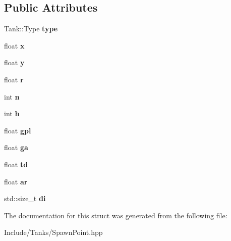 \subsection*{Public Attributes}
\begin{DoxyCompactItemize}
\item 
\hypertarget{struct_enemy_spawn_point_af4a2702c7808b9dd4002a8cd67119603}{}Tank\+::\+Type {\bfseries type}\label{struct_enemy_spawn_point_af4a2702c7808b9dd4002a8cd67119603}

\item 
\hypertarget{struct_enemy_spawn_point_a6b9ff06f1aa09043e675105f3e302d43}{}float {\bfseries x}\label{struct_enemy_spawn_point_a6b9ff06f1aa09043e675105f3e302d43}

\item 
\hypertarget{struct_enemy_spawn_point_a3301e2687a721f82d5e1cd60b56806d0}{}float {\bfseries y}\label{struct_enemy_spawn_point_a3301e2687a721f82d5e1cd60b56806d0}

\item 
\hypertarget{struct_enemy_spawn_point_a222bed8d5d664432c31cc3c133c754cf}{}float {\bfseries r}\label{struct_enemy_spawn_point_a222bed8d5d664432c31cc3c133c754cf}

\item 
\hypertarget{struct_enemy_spawn_point_aa6db28a2d501639d39179be2d0e944b8}{}int {\bfseries n}\label{struct_enemy_spawn_point_aa6db28a2d501639d39179be2d0e944b8}

\item 
\hypertarget{struct_enemy_spawn_point_a57a2d3a947c7f20774a5589e91aae030}{}int {\bfseries h}\label{struct_enemy_spawn_point_a57a2d3a947c7f20774a5589e91aae030}

\item 
\hypertarget{struct_enemy_spawn_point_a34055eac45cc2ca2cbb72034f972da61}{}float {\bfseries gpl}\label{struct_enemy_spawn_point_a34055eac45cc2ca2cbb72034f972da61}

\item 
\hypertarget{struct_enemy_spawn_point_aafaa8262fb403e40da8bb75518e627d8}{}float {\bfseries ga}\label{struct_enemy_spawn_point_aafaa8262fb403e40da8bb75518e627d8}

\item 
\hypertarget{struct_enemy_spawn_point_ad51b53e12ecd480a90b3750337c300a7}{}float {\bfseries td}\label{struct_enemy_spawn_point_ad51b53e12ecd480a90b3750337c300a7}

\item 
\hypertarget{struct_enemy_spawn_point_a3459088a7b10307fd1b165f6e007895a}{}float {\bfseries ar}\label{struct_enemy_spawn_point_a3459088a7b10307fd1b165f6e007895a}

\item 
\hypertarget{struct_enemy_spawn_point_a0cf5d8de51f554a3bd1644bba054d60e}{}std\+::size\+\_\+t {\bfseries di}\label{struct_enemy_spawn_point_a0cf5d8de51f554a3bd1644bba054d60e}

\end{DoxyCompactItemize}


The documentation for this struct was generated from the following file\+:\begin{DoxyCompactItemize}
\item 
Include/\+Tanks/Spawn\+Point.\+hpp\end{DoxyCompactItemize}
